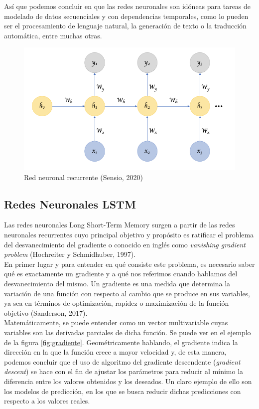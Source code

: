 Así que podemos concluir en que las redes neuronales son idóneas para tareas de modelado de datos secuenciales y con dependencias temporales, como lo pueden ser el procesamiento de lenguaje natural, la generación de texto o la traducción automática, entre muchas otras.
\begin{figure}[h]
	\centering
	\includegraphics[width = 1 \textwidth]{Imagenes/Vectorial/recurrente.png}
	\caption{Red neuronal recurrente (Sensio, 2020)}
	\label{fig:rnn}
\end{figure}


\subsection{Redes Neuronales LSTM} 

Las redes neuronales Long Short-Term Memory surgen a partir de las redes neuronales recurrentes cuyo principal objetivo y propósito es ratificar el problema del desvanecimiento del gradiente o conocido en inglés como \textit{vanishing gradient problem} (Hochreiter y Schmidhuber, 1997). \\

En primer lugar y para entender en qué consiste este problema, es necesario saber qué es exactamente un gradiente y a qué nos referimos cuando hablamos del desvanecimiento del mismo. Un gradiente es una medida que determina la variación de una función con respecto al cambio que se produce en sus variables, ya sea en términos de optimización, rapidez o maximización de la función objetivo (Sanderson, 2017). \\

Matemáticamente, se puede entender como un vector multivariable cuyas variables son las derivadas parciales de dicha función. Se puede ver en el ejemplo de la figura \ref{fig:gradiente}. Geométricamente hablando, el gradiente indica la dirección en la que la función crece a mayor velocidad y, de esta manera, podemos concluir que el uso de algoritmo del  gradiente descendente (\textit{gradient descent}) se hace con el fin de ajustar los parámetros para reducir al mínimo la diferencia entre los valores obtenidos y los deseados. Un claro ejemplo de ello son los modelos de predicción, en los que se busca reducir dichas predicciones con respecto a los valores reales. \\


